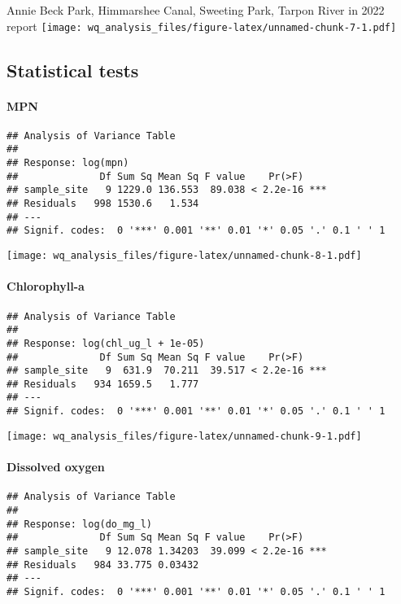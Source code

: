 \documentclass[
]{article}
\begin{document}
Annie Beck Park, Himmarshee Canal, Sweeting Park, Tarpon River in 2022
report
\texttt{[image: wq\_analysis\_files/figure-latex/unnamed-chunk-7-1.pdf]}

\hypertarget{statistical-tests}{%
\subsection{Statistical tests}\label{statistical-tests}}

\hypertarget{mpn}{%
\paragraph{MPN}\label{mpn}}

\begin{verbatim}
## Analysis of Variance Table
## 
## Response: log(mpn)
##              Df Sum Sq Mean Sq F value    Pr(>F)    
## sample_site   9 1229.0 136.553  89.038 < 2.2e-16 ***
## Residuals   998 1530.6   1.534                      
## ---
## Signif. codes:  0 '***' 0.001 '**' 0.01 '*' 0.05 '.' 0.1 ' ' 1
\end{verbatim}

\texttt{[image: wq\_analysis\_files/figure-latex/unnamed-chunk-8-1.pdf]}

\hypertarget{chlorophyll-a}{%
\paragraph{Chlorophyll-a}\label{chlorophyll-a}}

\begin{verbatim}
## Analysis of Variance Table
## 
## Response: log(chl_ug_l + 1e-05)
##              Df Sum Sq Mean Sq F value    Pr(>F)    
## sample_site   9  631.9  70.211  39.517 < 2.2e-16 ***
## Residuals   934 1659.5   1.777                      
## ---
## Signif. codes:  0 '***' 0.001 '**' 0.01 '*' 0.05 '.' 0.1 ' ' 1
\end{verbatim}

\texttt{[image: wq\_analysis\_files/figure-latex/unnamed-chunk-9-1.pdf]}

\hypertarget{dissolved-oxygen}{%
\paragraph{Dissolved oxygen}\label{dissolved-oxygen}}

\begin{verbatim}
## Analysis of Variance Table
## 
## Response: log(do_mg_l)
##              Df Sum Sq Mean Sq F value    Pr(>F)    
## sample_site   9 12.078 1.34203  39.099 < 2.2e-16 ***
## Residuals   984 33.775 0.03432                      
## ---
## Signif. codes:  0 '***' 0.001 '**' 0.01 '*' 0.05 '.' 0.1 ' ' 1
\end{verbatim}
\end{document}
